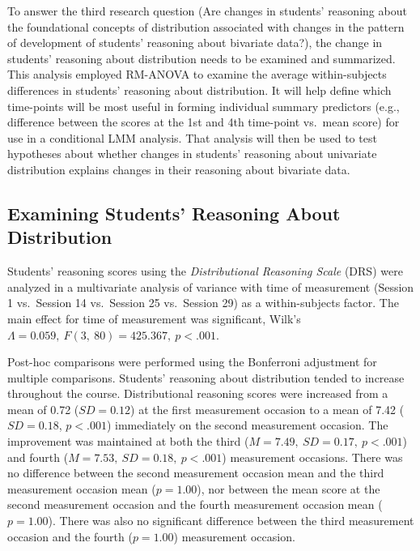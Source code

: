\documentclass[11pt]{umnthesis}
\begin{document}
To answer the third research question (Are changes in students' reasoning about the foundational concepts of distribution associated with changes in the pattern of development of students' reasoning about bivariate data?), the change in students' reasoning about distribution needs to be examined and summarized. This analysis employed RM-ANOVA to examine the average within-subjects differences in students' reasoning about distribution. It will help define which time-points will be most useful in forming individual summary predictors (e.g., difference between the scores at the 1st and 4th time-point vs.~mean score) for use in a conditional LMM analysis. That analysis will then be used to test hypotheses about whether changes in students' reasoning about univariate distribution explains changes in their reasoning about bivariate data.

\hypertarget{examining-students-reasoning-about-distribution}{%
\subsection{Examining Students' Reasoning About Distribution}\label{examining-students-reasoning-about-distribution}}

Students' reasoning scores using the \emph{Distributional Reasoning Scale} (DRS) were analyzed in a multivariate analysis of variance with time of measurement (Session 1 vs.~Session 14 vs.~Session 25 vs.~Session 29) as a within-subjects factor. The main effect for time of measurement was significant, Wilk's \(\Lambda=0.059,~F(3,~80) = 425.367,~p<.001\).

Post-hoc comparisons were performed using the Bonferroni adjustment for multiple comparisons. Students' reasoning about distribution tended to increase throughout the course. Distributional reasoning scores were increased from a mean of 0.72 (\(SD=0.12\)) at the first measurement occasion to a mean of 7.42 (\(SD=0.18\), \(p<.001\)) immediately on the second measurement occasion. The improvement was maintained at both the third (\(M=7.49,~SD=0.17,~p<.001\)) and fourth (\(M=7.53,~SD=0.18,~p<.001\)) measurement occasions. There was no difference between the second measurement occasion mean and the third measurement occasion mean (\(p=1.00\)), nor between the mean score at the second measurement occasion and the fourth measurement occasion mean (\(p=1.00\)). There was also no significant difference between the third measurement occasion and the fourth (\(p=1.00\)) measurement occasion.
\end{document}
